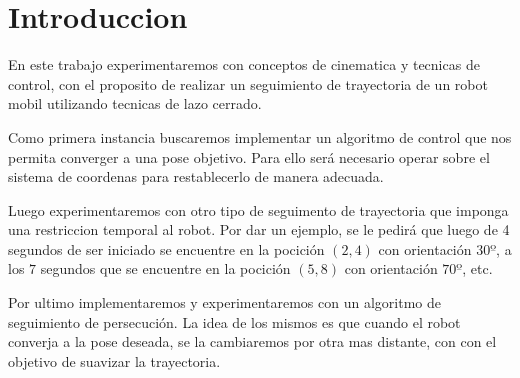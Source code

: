 \section{Introduccion}
En este trabajo experimentaremos con conceptos de cinematica y tecnicas de control, con el proposito de realizar un seguimiento de trayectoria de un robot mobil utilizando tecnicas de lazo cerrado.

Como primera instancia buscaremos implementar un algoritmo de control que nos permita converger a una pose objetivo. Para ello será necesario operar sobre el sistema de coordenas para restablecerlo de manera adecuada.

Luego experimentaremos con otro tipo de seguimento de trayectoria que imponga una restriccion temporal al robot. Por dar un ejemplo, se le pedirá que luego de 4 segundos de ser iniciado se encuentre en la pocición $(2,4)$ con orientación $30º$, a los $7$ segundos que se encuentre en la pocición $(5,8)$ con orientación $70º$, etc.

Por ultimo implementaremos y experimentaremos con un algoritmo de seguimiento de persecución. La idea de los mismos es que cuando el robot converja a la pose deseada, se la cambiaremos por otra mas distante, con con el objetivo de suavizar la trayectoria.